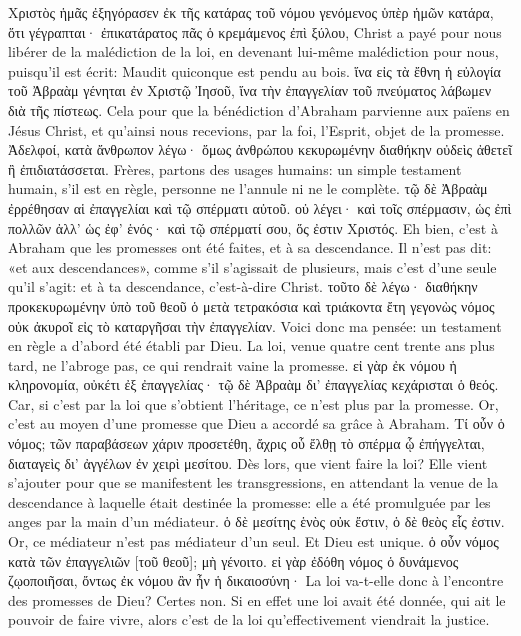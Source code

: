 \documentclass[14pt,a4paper,twoside]{extarticle}
\begin{document}
\begin{paracol}[1]
  \verset
  {Χριστὸς ἡμᾶς ἐξηγόρασεν ἐκ τῆς κατάρας τοῦ νόμου γενόμενος ὑπὲρ ἡμῶν κατάρα, ὅτι γέγραπται· ἐπικατάρατος πᾶς ὁ κρεμάμενος ἐπὶ ξύλου,}
  {Christ a payé pour nous libérer de la malédiction de la loi, en devenant lui-même malédiction pour nous, puisqu’il est écrit: Maudit quiconque est pendu au bois.}
  \verset
  {ἵνα εἰς τὰ ἔθνη ἡ εὐλογία τοῦ Ἀβραὰμ γένηται ἐν Χριστῷ Ἰησοῦ, ἵνα τὴν ἐπαγγελίαν τοῦ πνεύματος λάβωμεν διὰ τῆς πίστεως.}
  {Cela pour que la bénédiction d’Abraham parvienne aux païens en Jésus Christ, et qu’ainsi nous recevions, par la foi, l’Esprit, objet de la promesse.}
  \verset
  {Ἀδελφοί, κατὰ ἄνθρωπον λέγω· ὅμως ἀνθρώπου κεκυρωμένην διαθήκην οὐδεὶς ἀθετεῖ ἢ ἐπιδιατάσσεται.}
  {Frères, partons des usages humains: un simple testament humain, s’il est en règle, personne ne l’annule ni ne le complète.}
  \verset
  {τῷ δὲ Ἀβραὰμ ἐρρέθησαν αἱ ἐπαγγελίαι καὶ τῷ σπέρματι αὐτοῦ. οὐ λέγει· καὶ τοῖς σπέρμασιν, ὡς ἐπὶ πολλῶν ἀλλ’ ὡς ἐφ’ ἑνός· καὶ τῷ σπέρματί σου, ὅς ἐστιν Χριστός.}
  {Eh bien, c’est à Abraham que les promesses ont été faites, et à sa descendance. Il n’est pas dit: «et aux descendances», comme s’il s’agissait de plusieurs, mais c’est d’une seule qu’il s’agit: et à ta descendance, c’est-à-dire Christ.}
  \verset
  {τοῦτο δὲ λέγω· διαθήκην προκεκυρωμένην ὑπὸ τοῦ θεοῦ ὁ μετὰ τετρακόσια καὶ τριάκοντα ἔτη γεγονὼς νόμος οὐκ ἀκυροῖ εἰς τὸ καταργῆσαι τὴν ἐπαγγελίαν.}
  {Voici donc ma pensée: un testament en règle a d’abord été établi par Dieu. La loi, venue quatre cent trente ans plus tard, ne l’abroge pas, ce qui rendrait vaine la promesse.}
  \verset
  {εἰ γὰρ ἐκ νόμου ἡ κληρονομία, οὐκέτι ἐξ ἐπαγγελίας· τῷ δὲ Ἀβραὰμ δι’ ἐπαγγελίας κεχάρισται ὁ θεός.}
  {Car, si c’est par la loi que s’obtient l’héritage, ce n’est plus par la promesse. Or, c’est au moyen d’une promesse que Dieu a accordé sa grâce à Abraham.}
  \verset
  {Τί οὖν ὁ νόμος; τῶν παραβάσεων χάριν προσετέθη, ἄχρις οὗ ἔλθῃ τὸ σπέρμα ᾧ ἐπήγγελται, διαταγεὶς δι’ ἀγγέλων ἐν χειρὶ μεσίτου.}
  {Dès lors, que vient faire la loi? Elle vient s’ajouter pour que se manifestent les transgressions, en attendant la venue de la descendance à laquelle était destinée la promesse: elle a été promulguée par les anges par la main d’un médiateur.}
  \verset
  {ὁ δὲ μεσίτης ἑνὸς οὐκ ἔστιν, ὁ δὲ θεὸς εἷς ἐστιν.}
  {Or, ce médiateur n’est pas médiateur d’un seul. Et Dieu est unique.}
  \verset
  {ὁ οὖν νόμος κατὰ τῶν ἐπαγγελιῶν [τοῦ θεοῦ]; μὴ γένοιτο. εἰ γὰρ ἐδόθη νόμος ὁ δυνάμενος ζῳοποιῆσαι, ὄντως ἐκ νόμου ἂν ἦν ἡ δικαιοσύνη·}
  {La loi va-t-elle donc à l’encontre des promesses de Dieu? Certes non. Si en effet une loi avait été donnée, qui ait le pouvoir de faire vivre, alors c’est de la loi qu’effectivement viendrait la justice.}

\end{paracol}
\end{document}
